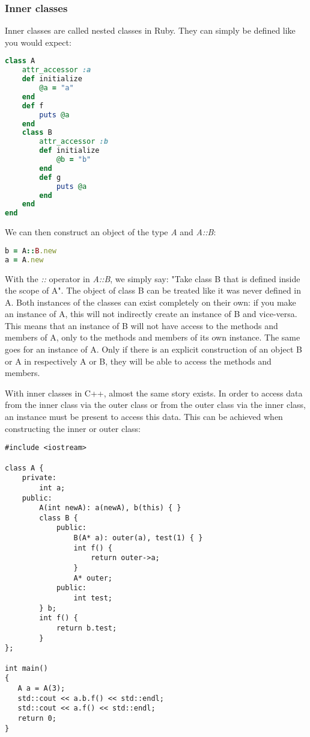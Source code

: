 \documentclass[10pt,a4paper,twocolumn]{article}
\begin{document}
\subsubsection{Inner classes}
Inner classes are called nested classes in Ruby. They can simply be defined like you would expect:

\begin{lstlisting}[language=Ruby]
class A
	attr_accessor :a
	def initialize
		@a = "a"
	end
	def f
		puts @a
	end
	class B
		attr_accessor :b
		def initialize 
			@b = "b"
		end
		def g
			puts @a
		end
	end
end
\end{lstlisting}

We can then construct an object of the type \textit{A} and \textit{A::B}:

\begin{lstlisting}[language=Ruby]
b = A::B.new
a = A.new
\end{lstlisting}

With the \textit{::} operator in \textit{A::B}, we simply say: "Take class B that is defined inside the scope of A". The object of class B can be treated like it was never defined in A. Both instances of the classes can exist completely on their own: if you make an instance of A, this will not indirectly create an instance of B and vice-versa. This means that an instance of B will not have access to the methods and members of A, only to the methods and members of its own instance. The same goes for an instance of A. Only if there is an explicit construction of an object B or A in respectively A or B, they will be able to access the methods and members.

With inner classes in C++, almost the same story exists. In order to access data from the inner class via the outer class or from the outer class via the inner class, an instance must be present to access this data. This can be achieved when constructing the inner or outer class:

\begin{lstlisting}
#include <iostream>

class A {
	private:
		int a;
	public:
		A(int newA): a(newA), b(this) { }
		class B {
			public:
				B(A* a): outer(a), test(1) { }
				int f() {
					return outer->a;
				}
				A* outer;
			public:
				int test;
		} b;
		int f() {
			return b.test;
		}
};
 
int main()
{
   A a = A(3);
   std::cout << a.b.f() << std::endl;
   std::cout << a.f() << std::endl;
   return 0;
}
\end{lstlisting}
\end{document}
